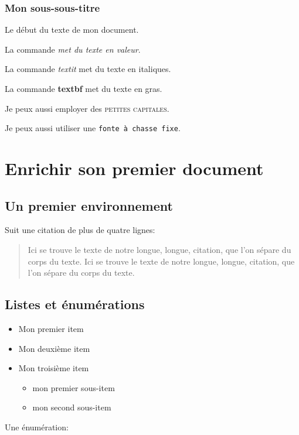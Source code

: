 \documentclass[12pt,a4paper]{book} %
\begin{document}
\subsubsection{Mon sous-sous-titre}

Le début du texte de mon document.

La commande \emph{met du texte en \emph{valeur}}.

La commande \textit{textit} met du texte en italiques.

La commande \textbf{textbf} met du texte en gras.

Je peux aussi employer des \textsc{petites capitales}.

Je peux aussi utiliser une \texttt{fonte à chasse fixe}.

\section{Enrichir son premier document}

\subsection{Un premier environnement}

Suit une citation de plus de quatre lignes:

\begin{quotation}
Ici se trouve le texte de notre longue, longue, citation, que l'on sépare du corps du texte. Ici se trouve le texte de notre longue, longue, citation, que l'on sépare du corps du texte.
\end{quotation}

\subsection{Listes et énumérations}
\begin{itemize}
\item Mon premier item
\item Mon deuxième item
\item Mon troisième item
	\begin{itemize}
	\item mon premier sous-item
	\item mon second sous-item
	\end{itemize}
\end{itemize}

Une énumération:
\end{document}
